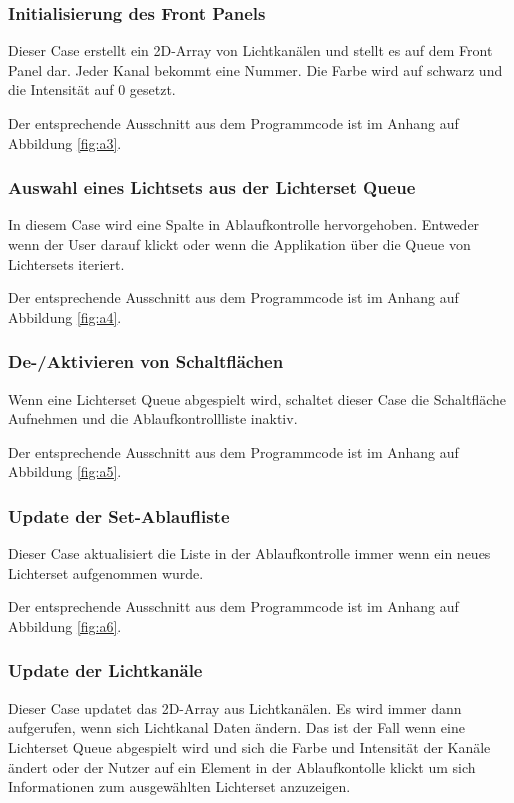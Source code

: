 
\subsubsection{Initialisierung des Front Panels}
Dieser Case erstellt ein 2D-Array von Lichtkanälen und stellt es auf dem Front Panel dar. Jeder Kanal bekommt eine Nummer. Die Farbe wird auf schwarz und die Intensität auf 0 gesetzt. 

Der entsprechende Ausschnitt aus dem Programmcode ist im Anhang auf Abbildung \ref{fig:a3}.

\subsubsection{Auswahl eines Lichtsets aus der Lichterset Queue}
In diesem Case wird eine Spalte in Ablaufkontrolle hervorgehoben. Entweder wenn der User darauf klickt oder wenn die Applikation über die Queue von Lichtersets iteriert. 

Der entsprechende Ausschnitt aus dem Programmcode ist im Anhang auf Abbildung \ref{fig:a4}.
 
\subsubsection{De-/Aktivieren von Schaltflächen}
Wenn eine Lichterset Queue abgespielt wird, schaltet dieser Case die Schaltfläche Aufnehmen und die Ablaufkontrollliste inaktiv. 

Der entsprechende Ausschnitt aus dem Programmcode ist im Anhang auf Abbildung \ref{fig:a5}.

\subsubsection{Update der Set-Ablaufliste}
Dieser Case aktualisiert die Liste in der Ablaufkontrolle immer wenn ein neues Lichterset aufgenommen wurde.

Der entsprechende Ausschnitt aus dem Programmcode ist im Anhang auf Abbildung \ref{fig:a6}.

\subsubsection{Update der Lichtkanäle}
Dieser Case updatet das 2D-Array aus Lichtkanälen. Es wird immer dann aufgerufen, wenn sich Lichtkanal Daten ändern. Das ist der Fall wenn eine Lichterset Queue abgespielt wird und sich die Farbe und Intensität der Kanäle ändert oder der Nutzer auf ein Element in der Ablaufkontolle klickt um sich Informationen zum ausgewählten Lichterset anzuzeigen.

